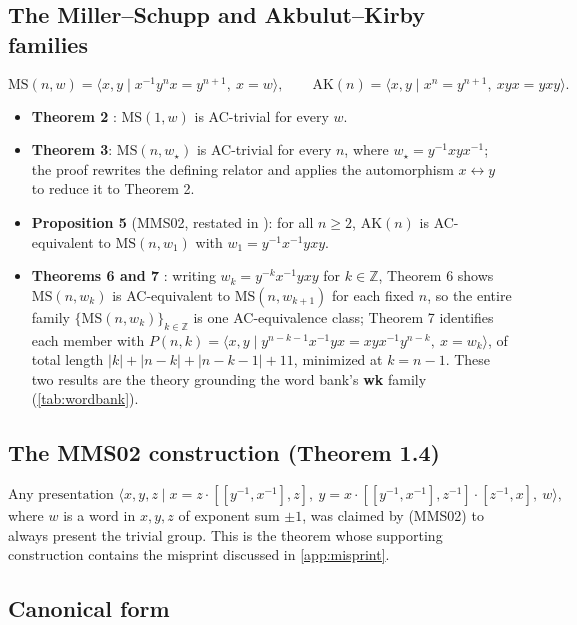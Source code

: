 \subsection{The Miller--Schupp and Akbulut--Kirby families}

\[
\mathrm{MS}(n,w) = \langle x,y \mid x^{-1}y^{n}x=y^{n+1},\ x=w\rangle, \qquad
\mathrm{AK}(n) = \langle x,y \mid x^{n}=y^{n+1},\ xyx=yxy\rangle.
\]

\begin{itemize}
  \item \textbf{Theorem 2} \cite{shehper2024hard}: $\mathrm{MS}(1,w)$ is AC-trivial for
    every $w$.
  \item \textbf{Theorem 3}: $\mathrm{MS}(n,w_\star)$ is AC-trivial for every $n$, where
    $w_\star=y^{-1}xyx^{-1}$; the proof rewrites the defining relator and applies the
    automorphism $x\leftrightarrow y$ to reduce it to Theorem 2.
  \item \textbf{Proposition 5} (MMS02, restated in \cite{shehper2024hard}): for all
    $n\ge2$, $\mathrm{AK}(n)$ is AC-equivalent to $\mathrm{MS}(n,w_1)$ with
    $w_1=y^{-1}x^{-1}yxy$.
  \item \textbf{Theorems 6 and 7} \cite{shehper2024hard}: writing $w_k=y^{-k}x^{-1}yxy$ for
    $k\in\mathbb{Z}$, Theorem 6 shows $\mathrm{MS}(n,w_k)$ is AC-equivalent to
    $\mathrm{MS}(n,w_{k+1})$ for each fixed $n$, so the entire family
    $\{\mathrm{MS}(n,w_k)\}_{k\in\mathbb{Z}}$ is one AC-equivalence class; Theorem 7
    identifies each member with $P(n,k)=\langle x,y \mid y^{n-k-1}x^{-1}yx=xyx^{-1}y^{n-k},\
    x=w_k\rangle$, of total length $|k|+|n-k|+|n-k-1|+11$, minimized at $k=n-1$. These two
    results are the theory grounding the word bank's \textbf{wk} family
    (\ref{tab:wordbank}).
\end{itemize}

\subsection{The MMS02 construction (Theorem 1.4)}

\[
\text{Any presentation } \langle x,y,z \mid x=z\cdot[[y^{-1},x^{-1}],z],\
y=x\cdot[[y^{-1},x^{-1}],z^{-1}]\cdot[z^{-1},x],\ w\rangle,
\]
where $w$ is a word in $x,y,z$ of exponent sum $\pm1$, was claimed by
\cite{myasnikov2002ac} (MMS02) to always present the trivial group. This is the theorem
whose supporting construction contains the misprint discussed in \ref{app:misprint}.

\subsection{Canonical form}

